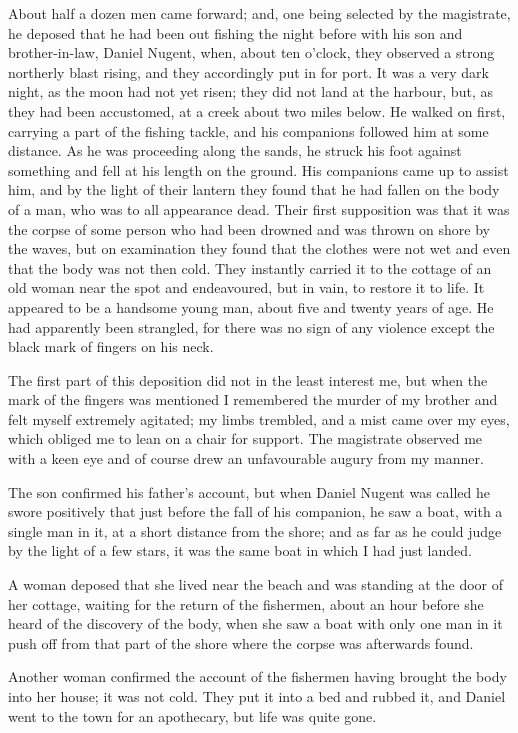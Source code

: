 \documentclass[12pt,openright]{book}
\begin{document}
About half a dozen men came forward; and, one being selected by the magistrate, he deposed that he had been out fishing the night before with his son and brother-in-law, Daniel Nugent, when, about ten o’clock, they observed a strong northerly blast rising, and they accordingly put in for port. It was a very dark night, as the moon had not yet risen; they did not land at the harbour, but, as they had been accustomed, at a creek about two miles below. He walked on first, carrying a part of the fishing tackle, and his companions followed him at some distance. As he was proceeding along the sands, he struck his foot against something and fell at his length on the ground. His companions came up to assist him, and by the light of their lantern they found that he had fallen on the body of a man, who was to all appearance dead. Their first supposition was that it was the corpse of some person who had been drowned and was thrown on shore by the waves, but on examination they found that the clothes were not wet and even that the body was not then cold. They instantly carried it to the cottage of an old woman near the spot and endeavoured, but in vain, to restore it to life. It appeared to be a handsome young man, about five and twenty years of age. He had apparently been strangled, for there was no sign of any violence except the black mark of fingers on his neck.

The first part of this deposition did not in the least interest me, but when the mark of the fingers was mentioned I remembered the murder of my brother and felt myself extremely agitated; my limbs trembled, and a mist came over my eyes, which obliged me to lean on a chair for support. The magistrate observed me with a keen eye and of course drew an unfavourable augury from my manner.

The son confirmed his father’s account, but when Daniel Nugent was called he swore positively that just before the fall of his companion, he saw a boat, with a single man in it, at a short distance from the shore; and as far as he could judge by the light of a few stars, it was the same boat in which I had just landed.

A woman deposed that she lived near the beach and was standing at the door of her cottage, waiting for the return of the fishermen, about an hour before she heard of the discovery of the body, when she saw a boat with only one man in it push off from that part of the shore where the corpse was afterwards found.

Another woman confirmed the account of the fishermen having brought the body into her house; it was not cold. They put it into a bed and rubbed it, and Daniel went to the town for an apothecary, but life was quite gone.
\end{document}
